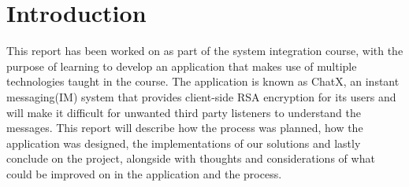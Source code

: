 \section{Introduction}

This report has been worked on as part of the system integration course, with the purpose of learning to develop an application that makes use of multiple technologies taught in the course. The application is known as ChatX, an instant messaging(IM) system that provides client-side RSA encryption for its users and will make it difficult for unwanted third party listeners to understand the messages. This report will describe how the process was planned, how the application was designed, the implementations of our solutions and lastly conclude on the project, alongside with thoughts and considerations of what could be improved on in the application and the process.